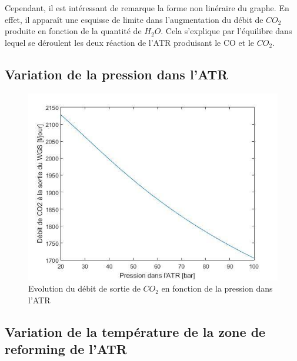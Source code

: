 \documentclass[12pt]{report}
\begin{document}
Cependant, il est intéressant de remarque la forme non linéraire du graphe. En effet, il apparaît une esquisse de limite dans l'augmentation du débit de $CO_2$ produite en fonction de la quantité de $H_2O$. Cela s'explique par l'équilibre dans lequel se déroulent les deux réaction de l'ATR produisant le CO et le $CO_2$.



\subsection{Variation de la pression dans l'ATR}

\begin{figure}[H]
\begin{center}
\includegraphics[scale=0.6]{debit_CO2_pression_ATR}
\caption{Evolution du débit de sortie de $CO_2$ en fonction de la pression dans l'ATR}
\end{center}
\end{figure}

\subsection{Variation de la température de la zone de reforming de l'ATR}
\end{document}
